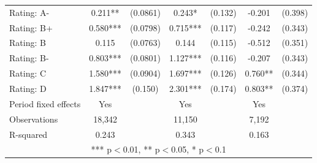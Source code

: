 \documentclass[12pt]{article}
\begin{document}
\begin{table}[H]
{\begin{tabular}{lcccccc}
    Rating: A- & 0.211** & (0.0861) & 0.243* & (0.132) & -0.201 & (0.398) \\
    Rating: B+ & 0.580*** & (0.0798) & 0.715*** & (0.117) & -0.242 & (0.343) \\
    Rating: B & 0.115 & (0.0763) & 0.144 & (0.115) & -0.512 & (0.351) \\
    Rating: B- & 0.803*** & (0.0801) & 1.127*** & (0.116) & -0.207 & (0.343) \\
    Rating: C & 1.580*** & (0.0904) & 1.697*** & (0.126) & 0.760** & (0.344) \\
    Rating: D & 1.847*** & (0.150) & 2.301*** & (0.174) & 0.803** & (0.374) \\
    \midrule
    Period fixed effects & Yes & & Yes & & Yes & \\
    Observations & 18,342 & & 11,150 & & 7,192 & \\
    R-squared & 0.243 & & 0.343 & & 0.163 & \\
    \bottomrule
    \multicolumn{7}{c}{*** p$<$0.01, ** p$<$0.05, * p$<$0.1} \\
    \end{tabular}%
    }
\end{table}
\end{document}
